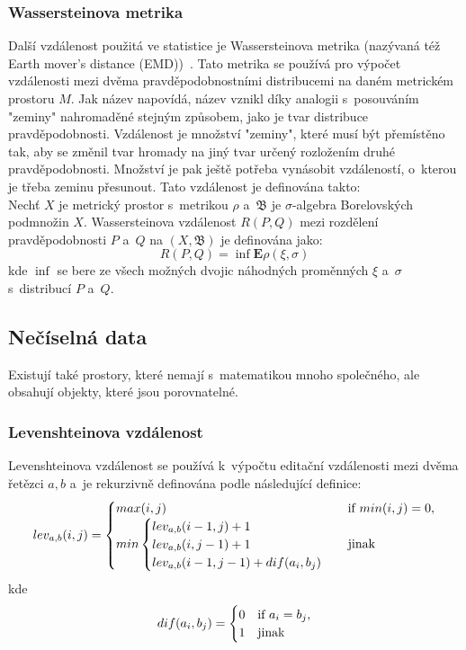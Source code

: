 \subsubsection{Wassersteinova metrika}
Další vzdálenost použitá ve statistice je Wassersteinova metrika (nazývaná též Earth mover's distance (EMD))~\cite{Vallender73}. Tato metrika se používá pro výpočet vzdá\-le\-nos\-ti mezi dvěma pravděpodobnostními distribucemi na daném metrickém prostoru $M$. Jak název napovídá, název vznikl díky analogii s~posouváním "zeminy" nahromaděné stejným způsobem, jako je tvar distribuce pravděpodobnosti. Vzdálenost je množství "zeminy", které musí být přemístěno tak, aby se změnil tvar hromady na jiný tvar určený rozložením druhé pravděpodobnosti. Množství je pak ještě potřeba vynásobit vzdáleností, o~kterou je třeba zeminu přesunout. Tato vzdálenost je definována takto: \\
Nechť $X$ je metrický prostor s~metrikou $\rho$ a~$\mathfrak {B}$ je $\sigma$-algebra Borelovských podmnožin $X$. Wassersteinova vzdálenost $R(P, Q)$ mezi rozdělení pravděpodobnosti $P$ a~$Q$ na $(X, \mathfrak{B}) $ je definována jako:
$$R(P,Q)=\inf\mathbf{E}\rho(\xi, \sigma)$$
kde $\inf$ se bere  ze všech možných dvojic náhodných proměnných $\xi$ a~$\sigma$ s~distribucí $P$ a~$Q$.\\

\subsection{Nečíselná data}
Existují také prostory, které nemají s~matematikou mnoho společného, ale obsahují objekty, které jsou porovnatelné.

\subsubsection{Levenshteinova vzdálenost} Levenshteinova vzdálenost se používá k~výpočtu editační vzdálenosti mezi dvěma řetězci $ a, b $ a~je rekurzivně definována podle následující definice:
\begin{equation*}
lev_{a,b}(i,j)=
\begin{cases}
max(i,j) & $if $ min(i,j)=0, \cr
min \begin{cases}
lev_{a,b}(i-1,j) + 1 \cr
lev_{a,b}(i,j-1) + 1 \cr
lev_{a,b}(i-1,j-1) + dif(a_i,b_j)
\end{cases} & $jinak$
\end{cases}
\end{equation*}
kde \begin{equation*}
dif(a_i,b_j)=
\begin{cases}
0 & $if $ a_i = b_j, \cr
1 & $jinak$
\end{cases}
\end{equation*}

